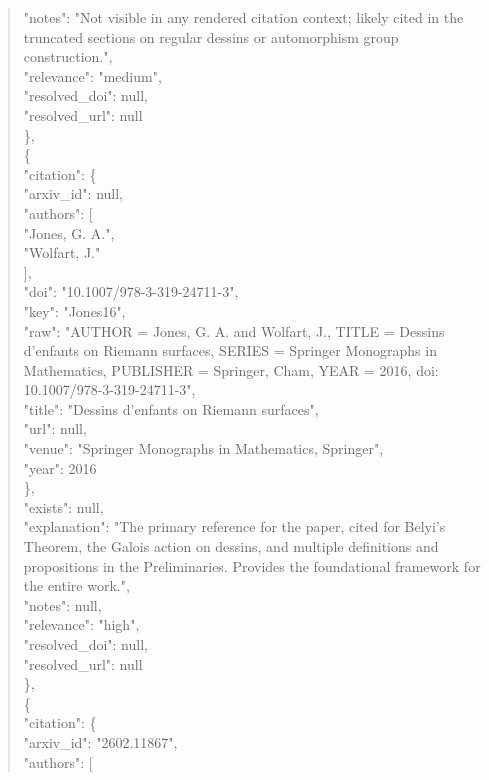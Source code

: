 \documentclass[11pt]{article}
\begin{document}
\begin{quote}
      "notes": "Not visible in any rendered citation context; likely cited in the truncated sections on regular dessins or automorphism group construction.",\\
      "relevance": "medium",\\
      "resolved\_doi": null,\\
      "resolved\_url": null\\
    \},\\
    \{\\
      "citation": \{\\
        "arxiv\_id": null,\\
        "authors": [\\
          "Jones, G. A.",\\
          "Wolfart, J."\\
        ],\\
        "doi": "10.1007/978-3-319-24711-3",\\
        "key": "Jones16",\\
        "raw": "AUTHOR = Jones, G. A. and Wolfart, J., TITLE = Dessins d'enfants on Riemann surfaces, SERIES = Springer Monographs in Mathematics, PUBLISHER = Springer, Cham, YEAR = 2016, doi: 10.1007/978-3-319-24711-3",\\
        "title": "Dessins d'enfants on Riemann surfaces",\\
        "url": null,\\
        "venue": "Springer Monographs in Mathematics, Springer",\\
        "year": 2016\\
      \},\\
      "exists": null,\\
      "explanation": "The primary reference for the paper, cited for Belyi's Theorem, the Galois action on dessins, and multiple definitions and propositions in the Preliminaries. Provides the foundational framework for the entire work.",\\
      "notes": null,\\
      "relevance": "high",\\
      "resolved\_doi": null,\\
      "resolved\_url": null\\
    \},\\
    \{\\
      "citation": \{\\
        "arxiv\_id": "2602.11867",\\
        "authors": [\\

\end{quote}
\end{document}
